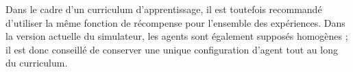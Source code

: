 \vspace{10pt}

\noindent Dans le cadre d'un curriculum d'apprentissage, il est toutefois recommandé d'utiliser la même fonction de récompense pour l'ensemble des expériences. Dans la version actuelle du simulateur, les agents sont également supposés homogènes ; il est donc conseillé de conserver une unique configuration d'agent tout au long du curriculum.
